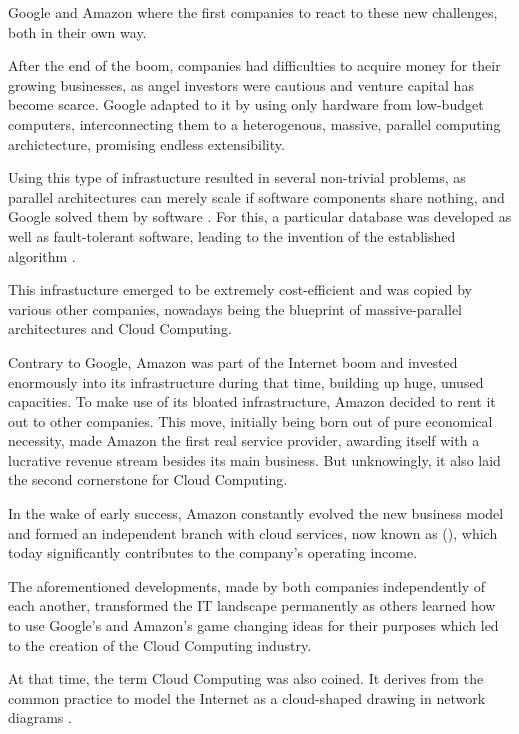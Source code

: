 Google and Amazon where the first companies to react to these new challenges, both in their own way.

After the end of the boom, companies had difficulties to acquire money for their growing businesses, as angel investors were cautious and venture capital has become scarce. Google adapted to it by using only hardware from low-budget computers, interconnecting them to a heterogenous, massive, parallel computing archictecture, promising endless extensibility. 

\pagebreak

Using this type of infrastucture resulted in several non-trivial problems, as parallel architectures can merely scale if software components share nothing, and Google solved them by software \cite{lee2011sharednothing}. For this, a particular database  was developed as well as fault-tolerant software, leading to the invention of the established  algorithm \cite{dean2004mapreduce}. 

This infrastucture emerged to be extremely cost-efficient and was copied by various other companies, nowadays being the blueprint of massive-parallel architectures and Cloud Computing.

Contrary to Google, Amazon was part of the Internet boom and invested enormously into its infrastructure during that time, building up huge, unused capacities. To make use of its bloated infrastructure, Amazon decided to rent it out to other companies. This move, initially being born out of pure economical necessity, made Amazon the first real service provider, awarding itself with a lucrative revenue stream besides its main business. But unknowingly, it also laid the second cornerstone for Cloud Computing. 

In the wake of early success, Amazon constantly evolved the new business model and formed an independent branch with cloud services, now known as  (), which today significantly contributes to the company's operating income.

The aforementioned developments, made by both companies independently of each another, transformed the IT landscape permanently as others learned how to use Google's and Amazon's game changing ideas for their purposes which led to the creation of the Cloud Computing industry.  

At that time, the term Cloud Computing was also coined. It derives from the common practice to model the Internet as a cloud-shaped drawing in network diagrams \cite{hausman2013cloud}.

